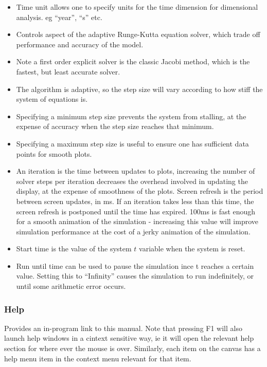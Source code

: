 \begin{itemize}
\item Time unit allows one to specify units for the time dimension for
  dimensional analysis. eg ``year'', ``s'' etc.
\item Controls aspect of the adaptive Runge-Kutta equation solver, which
trade off performance and accuracy of the model. 
\item Note a first order explicit solver is the classic Jacobi method, which is the fastest,
but least accurate solver. 
\item The algorithm is adaptive, so the
step size will vary according to how stiff the system of equations
is. 
\item Specifying a minimum step size prevents the system from stalling,
at the expense of accuracy when the step size reaches that
minimum. 
\item Specifying a maximum step size is useful to ensure one has
sufficient data points for smooth plots.
\item An iteration is the time between updates to plots, increasing the
number of solver steps per iteration decreases the overhead involved
in updating the display, at the expense of smoothness of the
plots. Screen refresh is the period between screen updates, in ms. If
an iteration takes less than this time, the screen refresh is postponed
until the time has expired. 100ms is fast enough for a smooth
animation of the simulation - increasing this value will improve
simulation performance at the cost of a jerky animation of the
simulation.
\item Start time is the value of the system $t$ variable when the
  system is reset.
\item Run until time can be used to pause the simulation ince t
  reaches a certain value. Setting this to ``Infinity'' causes the
  simulation to run indefinitely, or until some arithmetic error
  occurs.
\end{itemize}

\subsubsection{Help}
\label{Help}

Provides an in-program link to this manual. Note that pressing F1 will
also launch help windows in a cintext sensitive way, ie it will open
the relevant help section for where ever the mouse is over. Similarly,
each item on the canvas has a help menu item in the context menu
relevant for that item.

